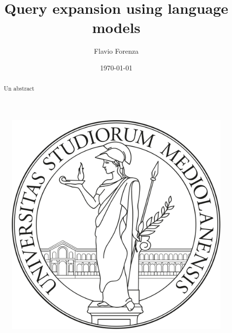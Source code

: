 \documentclass[letterpaper,12pt]{article}
\begin{document}
    
\title{\bfseries{Query expansion using language models}}
\author{Flavio Forenza}
\date\today
\maketitle

\begin{figure}[h!]
  \centering
  \includegraphics[width=0.2\linewidth]{images/logoUnimi2.png}
  \centering
\end{figure}

\begin{abstract}
    Un abstract
\end{abstract}



\newpage


\newpage


\end{document}
